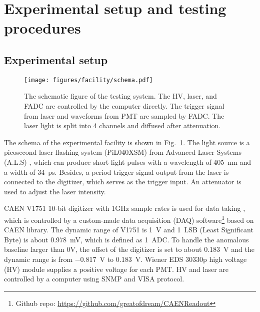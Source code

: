 \section{Experimental setup and testing procedures}
\label{SetUp}
\subsection{Experimental setup}
\label{sec:setup}
\begin{figure}[!htbp]
    \centering
    \texttt{[image: figures/facility/schema.pdf]}
    \caption{The schematic figure of the testing system. The HV, laser, and FADC are controlled by the computer directly. The trigger signal from laser and waveforms from PMT are sampled by FADC. The laser light is split into 4 channels and diffused after attenuation.}
    \label{fig:facility}
\end{figure}

The schema of the experimental facility is shown in Fig.~\ref{fig:facility}. The light source is a picosecond laser flashing system (PiL040XSM) from Advanced Laser Systems (A.L.S) \cite{NTKLaser}, which can produce short light pulses with a wavelength of \SI{405}{nm} and a width of \SI{34}{ps}. Besides, a period trigger signal output from the laser is connected to the digitizer, which serves as the trigger input. An attenuator is used to adjust the laser intensity.

CAEN V1751 10-bit digitizer with 1GHz sample rates is used for data taking \cite{CAENV1751}, which is controlled by a custom-made data acquisition (DAQ) software\footnote{Github repo: \url{https://github.com/greatofdream/CAENReadout}} based on CAEN library. The dynamic range of V1751 is \SI{1}{V} and \SI{1}{LSB} (Least Significant Byte) is about \SI{0.978}{mV}, which is defined as \SI{1}{ADC}. To handle the anomalous baseline larger than 0V, the offset of the digitizer is set to about \SI{0.183}{V} and the dynamic range is from \SI{-0.817}{V} to \SI{0.183}{V}. Wiener EDS 30330p high voltage (HV) module \cite{WIENERHV} supplies a positive voltage for each PMT. HV and laser are controlled by a computer using SNMP \cite{SNMP} and VISA \cite{VISA} protocol.

